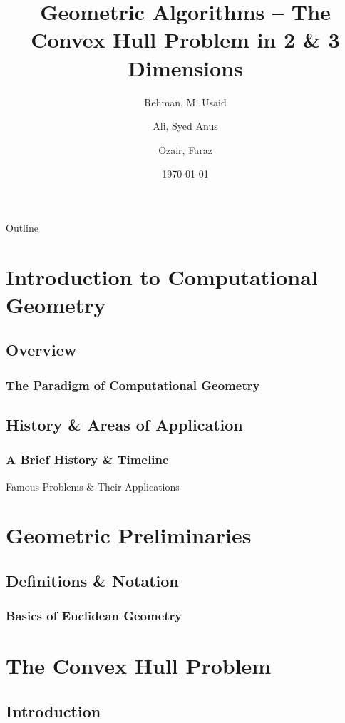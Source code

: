 \documentclass{beamer}
\title[Geometric Algorithms: Convex Hull]{Geometric Algorithms -- The Convex Hull Problem in 2 \& 3 Dimensions}
\author[Rehman, Ali, Ozair] %
{Rehman, M. Usaid \and Ali, Syed Anus \and Ozair, Faraz}
\institute{Habib University} %
\date{\today} %
\begin{document}
\begin{frame}
  \titlepage
\end{frame}

\begin{frame}{Outline}
  \tableofcontents%
\end{frame}


\section{Introduction to Computational Geometry}

\subsection{Overview}
\begin{frame}
  \frametitle{The Paradigm of Computational Geometry}
\end{frame}

\subsection{History \& Areas of Application}
\begin{frame}
  \frametitle{A Brief History \& Timeline}
\end{frame}

\begin{frame}{Famous Problems \& Their Applications}
    
\end{frame}

\section{Geometric Preliminaries}
\subsection{Definitions \& Notation}
\begin{frame}
  \frametitle{Basics of Euclidean Geometry}
\end{frame}

\section{The Convex Hull Problem}
\subsection{Introduction}
\end{document}

